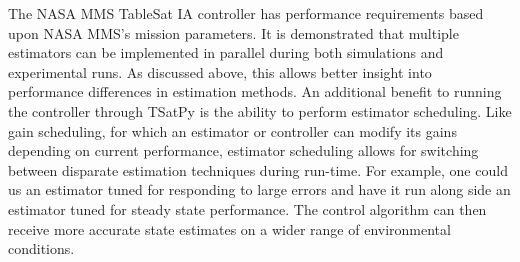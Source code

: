 The NASA MMS TableSat IA controller has performance requirements based upon NASA MMS's mission parameters.  It is demonstrated that multiple estimators can be implemented in parallel during both simulations and experimental runs.  As discussed above, this allows better insight into performance differences in estimation methods.  An additional benefit to running the controller through TSatPy is the ability to perform estimator scheduling.  Like gain scheduling, for which an estimator or controller can modify its gains depending on current performance, estimator scheduling allows for switching between disparate estimation techniques during run-time.  For example, one could us an estimator tuned for responding to large errors and have it run along side an estimator tuned for steady state performance.  The control algorithm can then receive more accurate state estimates on a wider range of environmental conditions.

